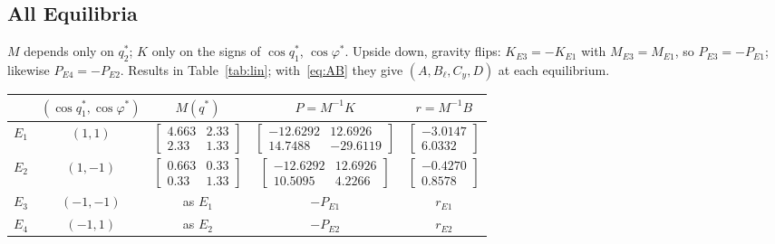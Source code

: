 \documentclass[10pt,letterpaper]{article}
\begin{document}
\noindent\begin{minipage}[t]{0.42\textwidth}\vspace{0pt}
\subsection{All Equilibria}
$M$ depends only on $q_2^*$; $K$ only on the signs of $\cos q_1^*$, $\cos\varphi^*$. Upside down, gravity flips: $K_{E3}=-K_{E1}$ with $M_{E3}=M_{E1}$, so $P_{E3}=-P_{E1}$; likewise $P_{E4}=-P_{E2}$. Results in Table~\ref{tab:lin}; with~\eqref{eq:AB} they give $(A,B_\ell,C_y,D)$ at each equilibrium.
\end{minipage}\hfill
\begin{minipage}[t]{0.55\textwidth}\vspace{2pt}
\centering
{}\label{tab:lin}
\footnotesize\setlength{\tabcolsep}{4pt}\renewcommand{\arraystretch}{1.0}
\begin{tabular}{@{}ccccc@{}}
\toprule
 & $(\cos q_1^*,\cos\varphi^*)$ & $M(q^*)$ & $P=M^{-1}K$ & $r=M^{-1}B$\\
\midrule
$E_1$ & $(1,1)$ & $\left[\begin{smallmatrix}4.663&2.33\\2.33&1.33\end{smallmatrix}\right]$ & $\left[\begin{smallmatrix}-12.6292&12.6926\\14.7488&-29.6119\end{smallmatrix}\right]$ & $\left[\begin{smallmatrix}-3.0147\\6.0332\end{smallmatrix}\right]$\\
$E_2$ & $(1,-1)$ & $\left[\begin{smallmatrix}0.663&0.33\\0.33&1.33\end{smallmatrix}\right]$ & $\left[\begin{smallmatrix}-12.6292&12.6926\\10.5095&4.2266\end{smallmatrix}\right]$ & $\left[\begin{smallmatrix}-0.4270\\0.8578\end{smallmatrix}\right]$\\
$E_3$ & $(-1,-1)$ & as $E_1$ & $-P_{E1}$ & $r_{E1}$\\
$E_4$ & $(-1,1)$ & as $E_2$ & $-P_{E2}$ & $r_{E2}$\\
\bottomrule
\end{tabular}
\end{minipage}
\end{document}
